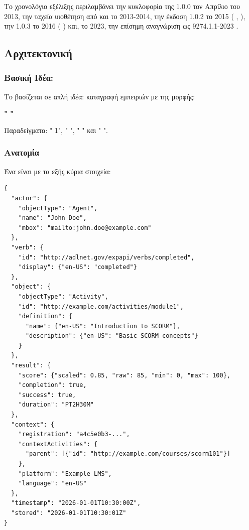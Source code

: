 Το χρονολόγιο εξέλιξης περιλαμβάνει την κυκλοφορία της  1.0.0  τον Απρίλιο του 2013, την ταχεία υιοθέτηση από  και   το 2013-2014, την έκδοση  1.0.2 το 2015 ( , ), την  1.0.3 το 2016 ( ) και, το 2023, την επίσημη αναγνώριση ως  9274.1.1-2023 .

\subsection{Αρχιτεκτονική }
\label{subsec:xapi_architecture}

\subsubsection{Βασική Ιδέα:  }

Το  βασίζεται σε απλή ιδέα: καταγραφή εμπειριών με  της μορφής:

\begin{center}
\textbf{"  "}
\end{center}

Παραδείγματα: " \textit{}  1", " \textit{}  ", "  \textit{}  " και " \textit{}  ".

\subsubsection{Ανατομία  }

Ένα   είναι   με τα εξής κύρια στοιχεία:

{\selectfont
\begin{verbatim}
{
  "actor": {
    "objectType": "Agent",
    "name": "John Doe",
    "mbox": "mailto:john.doe@example.com"
  },
  "verb": {
    "id": "http://adlnet.gov/expapi/verbs/completed",
    "display": {"en-US": "completed"}
  },
  "object": {
    "objectType": "Activity",
    "id": "http://example.com/activities/module1",
    "definition": {
      "name": {"en-US": "Introduction to SCORM"},
      "description": {"en-US": "Basic SCORM concepts"}
    }
  },
  "result": {
    "score": {"scaled": 0.85, "raw": 85, "min": 0, "max": 100},
    "completion": true,
    "success": true,
    "duration": "PT2H30M"
  },
  "context": {
    "registration": "a4c5e0b3-...",
    "contextActivities": {
      "parent": [{"id": "http://example.com/courses/scorm101"}]
    },
    "platform": "Example LMS",
    "language": "en-US"
  },
  "timestamp": "2026-01-01T10:30:00Z",
  "stored": "2026-01-01T10:30:01Z"
}
\end{verbatim}
}

